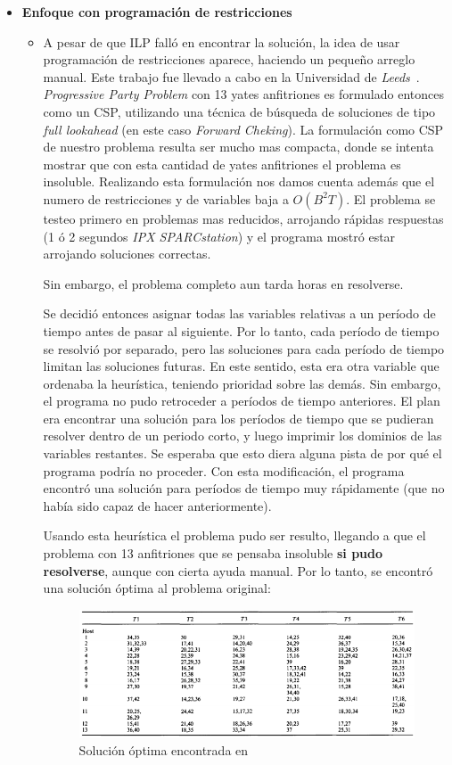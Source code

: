 \documentclass[letter, 10pt]{article}
\begin{document}
\begin{itemize}
\item \textbf{Enfoque con programación de restricciones}
\begin{itemize}
\item A pesar de que ILP falló en encontrar la solución, la idea de usar programación de restricciones aparece, haciendo un pequeño arreglo manual. Este trabajo fue llevado a cabo en la Universidad de \textit{Leeds}~\cite{Smith1996}. \textit{Progressive Party Problem} con 13 yates anfitriones es formulado entonces como un CSP, utilizando una técnica de búsqueda de soluciones de tipo \textit{full lookahead} (en este caso \textit{Forward Cheking}).
La formulación como CSP de nuestro problema resulta ser mucho mas compacta, donde se intenta mostrar que con esta cantidad de yates anfitriones el problema es insoluble. Realizando esta formulación nos damos cuenta además que el numero de restricciones y de variables baja a $O(B^2T)$. El problema se testeo primero en problemas mas reducidos, arrojando rápidas respuestas (1 ó 2 segundos \textit{IPX SPARCstation}) y el programa mostró estar arrojando soluciones correctas.

Sin embargo, el problema completo aun  tarda horas en resolverse.

Se decidió entonces asignar todas las variables relativas a un período de tiempo antes de pasar al siguiente. Por lo tanto, cada período de tiempo se resolvió por separado, pero las soluciones para cada período de tiempo limitan las soluciones futuras. En este sentido, esta era otra variable que ordenaba la heurística, teniendo prioridad sobre las demás. Sin embargo, el programa no pudo retroceder a períodos de tiempo anteriores. El plan era encontrar una solución para los períodos de tiempo que se pudieran resolver dentro de un periodo corto, y luego imprimir los dominios de las variables restantes. Se esperaba que esto diera alguna pista de por qué el programa podría no proceder. Con esta modificación, el programa encontró una solución para períodos de tiempo muy rápidamente (que no había sido capaz de hacer anteriormente).

Usando esta heurística el problema pudo ser resulto, llegando a que el problema con 13 anfitriones que se pensaba insoluble \textbf{si pudo resolverse}, aunque con cierta ayuda manual. Por lo tanto, se encontró una solución óptima al problema original:

\begin{figure}[ht]
\centering
 \includegraphics[width=1.0\textwidth]{party3.png}
 \caption{Solución óptima encontrada en ~\cite{Brailsford:1996:OSE:241748.241755}}
\end{figure}


\end{itemize}
\end{itemize}
\end{document}
